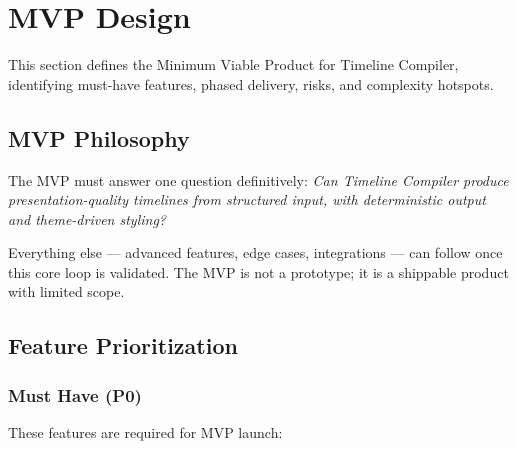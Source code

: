 \section{MVP Design}
\label{sec:mvp}

This section defines the Minimum Viable Product for Timeline Compiler, identifying must-have features, phased delivery, risks, and complexity hotspots.

\subsection{MVP Philosophy}

The MVP must answer one question definitively: \emph{Can Timeline Compiler produce presentation-quality timelines from structured input, with deterministic output and theme-driven styling?}

Everything else — advanced features, edge cases, integrations — can follow once this core loop is validated. The MVP is not a prototype; it is a shippable product with limited scope.

\subsection{Feature Prioritization}

\subsubsection{Must Have (P0)}

These features are required for MVP launch:

